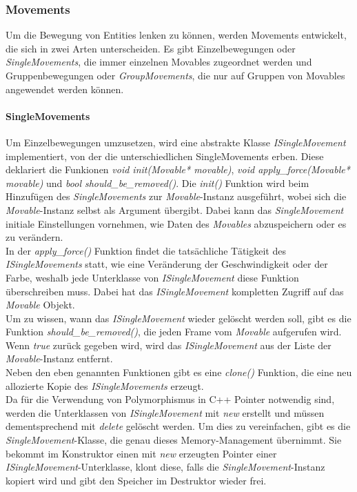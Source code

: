 \documentclass[11pt,a4paper]{article}
\begin{document}
\subsubsection{Movements}
Um die Bewegung von Entities lenken zu können, werden Movements entwickelt, die sich in zwei Arten unterscheiden. Es gibt Einzelbewegungen oder \textit{SingleMovements}, die immer einzelnen Movables zugeordnet werden und Gruppenbewegungen oder \mbox{\textit{GroupMovements}}, die nur auf Gruppen von Movables angewendet werden können.

\paragraph{SingleMovements}
Um Einzelbewegungen umzusetzen, wird eine abstrakte Klasse \textit{ISingleMovement} implementiert, von der die unterschiedlichen SingleMovements erben. Diese deklariert die Funkionen \textit{void init(Movable* movable)}, \textit{void apply\_force(Movable* movable)} und \textit{bool should\_be\_removed()}. Die \textit{init()} Funktion wird beim Hinzufügen des \textit{SingleMovements} zur \textit{Movable}-Instanz ausgeführt, wobei sich die \textit{Movable}-Instanz selbst als Argument übergibt. Dabei kann das \textit{SingleMovement} initiale Einstellungen vornehmen, wie Daten des \textit{Movables} abzuspeichern oder es zu verändern.\\
In der \textit{apply\_force()} Funktion findet die tatsächliche Tätigkeit des \textit{ISingleMovements} statt, wie eine Veränderung der Geschwindigkeit oder der Farbe, weshalb jede Unterklasse von \textit{ISingleMovement} diese Funktion überschreiben muss. Dabei hat das \textit{ISingleMovement} kompletten Zugriff auf das \textit{Movable} Objekt.\\
Um zu wissen, wann das \textit{ISingleMovement} wieder gelöscht werden soll, gibt es die Funktion \textit{should\_be\_removed()}, die jeden Frame vom \textit{Movable} aufgerufen wird. Wenn \textit{true} zurück gegeben wird, wird das \textit{ISingleMovement} aus der Liste der \textit{Movable}-Instanz entfernt.\\
Neben den eben genannten Funktionen gibt es eine \textit{clone()} Funktion, die eine neu allozierte Kopie des \textit{ISingleMovements} erzeugt.\\
Da für die Verwendung von Polymorphismus in C++ Pointer notwendig sind, werden die Unterklassen von \textit{ISingleMovement} mit \textit{new} erstellt und müssen dementsprechend mit \textit{delete} gelöscht werden. Um dies zu vereinfachen, gibt es die \textit{SingleMovement}-Klasse, die genau dieses Memory-Management übernimmt. Sie bekommt im Konstruktor einen mit \textit{new} erzeugten Pointer einer \textit{ISingleMovement}-Unterklasse, klont diese, falls die \textit{SingleMovement}-Instanz kopiert wird und gibt den Speicher im Destruktor wieder frei.
\end{document}
